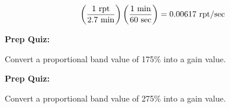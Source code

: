 \vskip 10pt

$$\left(1 \hbox{ rpt} \over 2.7 \hbox{ min}\right) \left(1 \hbox{ min} \over 60 \hbox{ sec}\right) = 0.00617 \hbox{ rpt/sec}$$






\vfil \eject

\noindent
{\bf Prep Quiz:}

Convert a proportional band value of 175\% into a gain value.







\vfil \eject

\noindent
{\bf Prep Quiz:}

Convert a proportional band value of 275\% into a gain value.






